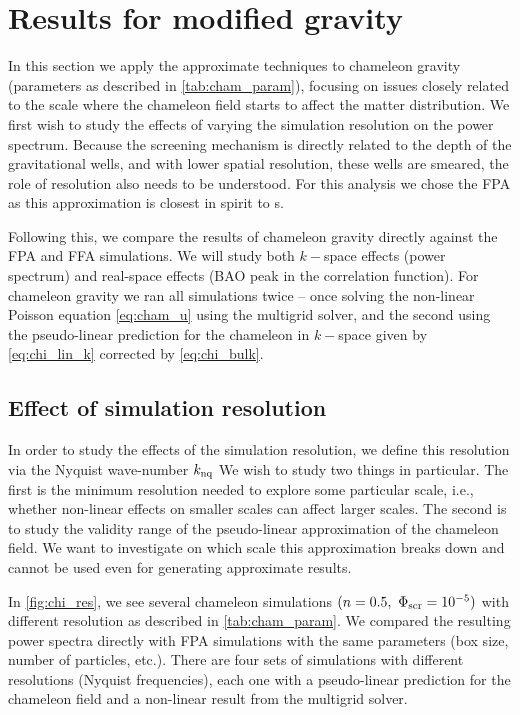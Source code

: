 \section{Results for modified gravity}
In this section we apply the approximate techniques to chameleon gravity (parameters as described in \autoref{tab:cham_param}), focusing on issues closely related to the scale where the chameleon field starts to affect the matter distribution. We first wish to study the effects of varying the simulation resolution on the power spectrum. Because the screening mechanism is directly related to the depth of the gravitational wells, and with lower spatial resolution, these wells are smeared, the role of resolution also needs to be understood. For this analysis we chose the FPA as this approximation is closest in spirit to \nbody s.

Following this, we compare the results of chameleon gravity directly against the FPA and FFA simulations. %
We will study both $k-$space effects (power spectrum) and real-space effects (BAO peak in the correlation function). For chameleon gravity we ran all simulations twice -- once solving the non-linear Poisson equation \eqref{eq:cham_u} using the multigrid solver, and the second using the pseudo-linear prediction for the chameleon in $k-$space given by \eqref{eq:chi_lin_k} corrected by \eqref{eq:chi_bulk}.
\subsection{Effect of simulation resolution}
In order to study the effects of the simulation resolution, we define this resolution via the Nyquist wave-number $k_{\rm nq}$
We wish to study two things in particular. The first is the minimum resolution needed to explore some particular scale, i.e., whether non-linear effects on smaller scales can affect larger scales. The second is to study the validity range of the pseudo-linear approximation of the chameleon field. We want to investigate on which scale this approximation breaks down and cannot be used even for generating approximate results.

In \autoref{fig:chi_res}, we see several chameleon simulations $(n=0.5,\ \Phi_{\text{\scriptsize scr}}=10^{-5})$ with different resolution as described in \autoref{tab:cham_param}. We compared the resulting power spectra directly with FPA simulations with the same parameters (box size, number of particles, etc.). There are four sets of simulations with different resolutions (Nyquist frequencies), each one with a pseudo-linear prediction for the chameleon field and a non-linear result from the multigrid solver.

